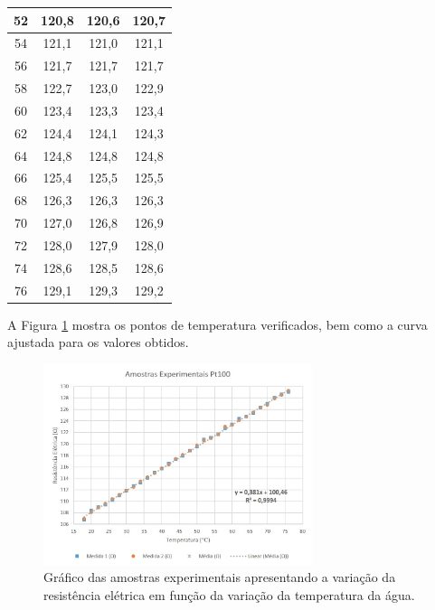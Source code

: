 \documentclass[a4paper]{instrumentacao}
\begin{document}
\begin{table}[]
\begin{tabular}{|c|c|c|c|}
52                  & 120,8                 & 120,6                 & 120,7          \\ \hline
54                  & 121,1                 & 121,0                 & 121,1          \\ \hline
56                  & 121,7                 & 121,7                 & 121,7          \\ \hline
58                  & 122,7                 & 123,0                 & 122,9          \\ \hline
60                  & 123,4                 & 123,3                 & 123,4          \\ \hline
62                  & 124,4                 & 124,1                 & 124,3          \\ \hline
64                  & 124,8                 & 124,8                 & 124,8          \\ \hline
66                  & 125,4                 & 125,5                 & 125,5          \\ \hline
68                  & 126,3                 & 126,3                 & 126,3          \\ \hline
70                  & 127,0                 & 126,8                 & 126,9          \\ \hline
72                  & 128,0                 & 127,9                 & 128,0          \\ \hline
74                  & 128,6                 & 128,5                 & 128,6          \\ \hline
76                  & 129,1                 & 129,3                 & 129,2          \\ \hline
\end{tabular}
\end{table}

A Figura \ref{fig:pt100-amostras}  mostra os pontos de temperatura verificados, bem como a curva ajustada para os valores obtidos.

\begin{figure}[H]
\center
\includegraphics[width=0.7\textwidth]{pt100_puro.jpg}
\caption{Gráfico das amostras experimentais apresentando a variação da resistência elétrica em função da variação da temperatura da água.}
\label{fig:pt100-amostras}
\end{figure}
\end{document}
